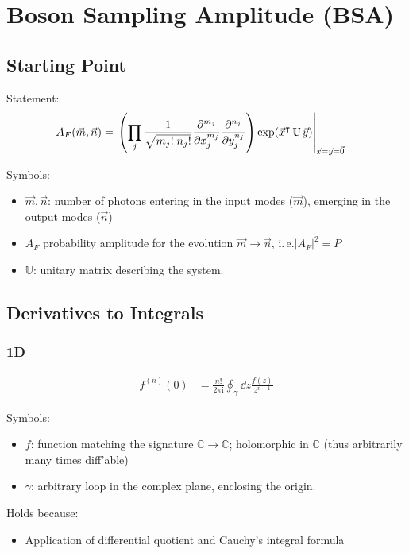 \documentclass[
	english,
	a4paper,
	fontsize=10pt,
	parskip=half,
	titlepage=true,
	DIV=12,
	final
]{scrreprt}
\title{\myTitle}
\author{\myName}
\date{\today}
\newcommand*{\ie}{i.\,e.\xspace}
\newcommand*{\thus}{\ensuremath{\rightarrow}\xspace}
\newcommand*{\transp}{\ensuremath{^\intercal}}
\newcommand*{\iunit}{\ensuremath{\mathrm{i}}}
\newcommand*{\setComplex}  {\ensuremath{\mathbb{C}}}
\begin{document}
\tableofcontents
\newpage

\chapter{Boson Sampling Amplitude (BSA)}
\section{Starting Point}
Statement:
\begin{align}
	A_F(\vec{m}, \vec{n})
&=
	\eval{\qty(
			\prod_{j}
			\frac
				{1}
				{\sqrt{m_j! \; n_j!}}
			\pdv[m_j]{x_j}
			\pdv[n_j]{y_j}
		) \exp(\vec{x}\transp \, \mathbb{U} \, \vec{y})
	}_{\vec{x} = \vec{y} = \vec{0}}
\label{eqn:BSA_raw}
\end{align}

Symbols:
\begin{itemize}
\item $\vec{m}, \vec{n}$: number of photons entering in the input modes ($\vec{m}$), emerging in the
	output modes ($\vec{n}$)
\item $A_F$ probability amplitude for the evolution $\vec{m} \thus \vec{n}$, \ie $|A_F|^{2} = P$
\item $\mathbb{U}$: unitary matrix describing the system.
\end{itemize}


\section{Derivatives to Integrals}
\subsection{1D} 
\label{sec:DevToInt_1D}
\begin{align}
	f^{(n)}(0)
&=
	\frac{n!}{2\pi \iunit}
	\oint_\gamma \dd{z}
		\frac
			{f(z)}
			{z^{n+1}}
\end{align}

Symbols:
\begin{itemize}
\item $f$: function matching the signature $\setComplex \thus \setComplex$; holomorphic in \setComplex
	(thus arbitrarily many times diff'able)
\item $\gamma$: arbitrary loop in the complex plane, enclosing the origin.
\end{itemize}

Holds because:
\begin{itemize}
\item Application of differential quotient and Cauchy's integral formula
\end{itemize}
\end{document}

